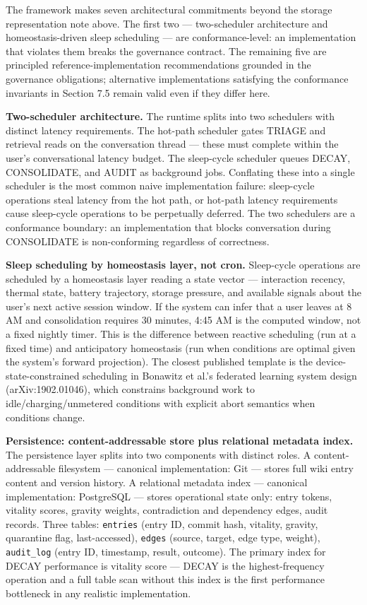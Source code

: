 \documentclass[
  11pt,
]{article}
\begin{document}
The framework makes seven architectural commitments beyond the storage
representation note above. The first two --- two-scheduler architecture
and homeostasis-driven sleep scheduling --- are conformance-level: an
implementation that violates them breaks the governance contract. The
remaining five are principled reference-implementation recommendations
grounded in the governance obligations; alternative implementations
satisfying the conformance invariants in Section 7.5 remain valid even
if they differ here.

\textbf{Two-scheduler architecture.} The runtime splits into two
schedulers with distinct latency requirements. The hot-path scheduler
gates TRIAGE and retrieval reads on the conversation thread --- these
must complete within the user's conversational latency budget. The
sleep-cycle scheduler queues DECAY, CONSOLIDATE, and AUDIT as background
jobs. Conflating these into a single scheduler is the most common naive
implementation failure: sleep-cycle operations steal latency from the
hot path, or hot-path latency requirements cause sleep-cycle operations
to be perpetually deferred. The two schedulers are a conformance
boundary: an implementation that blocks conversation during CONSOLIDATE
is non-conforming regardless of correctness.

\textbf{Sleep scheduling by homeostasis layer, not cron.} Sleep-cycle
operations are scheduled by a homeostasis layer reading a state vector
--- interaction recency, thermal state, battery trajectory, storage
pressure, and available signals about the user's next active session
window. If the system can infer that a user leaves at 8 AM and
consolidation requires 30 minutes, 4:45 AM is the computed window, not a
fixed nightly timer. This is the difference between reactive scheduling
(run at a fixed time) and anticipatory homeostasis (run when conditions
are optimal given the system's forward projection). The closest
published template is the device-state-constrained scheduling in
Bonawitz et al.'s federated learning system design (arXiv:1902.01046),
which constrains background work to idle/charging/unmetered conditions
with explicit abort semantics when conditions change.

\textbf{Persistence: content-addressable store plus relational metadata
index.} The persistence layer splits into two components with distinct
roles. A content-addressable filesystem --- canonical implementation:
Git --- stores full wiki entry content and version history. A relational
metadata index --- canonical implementation: PostgreSQL --- stores
operational state only: entry tokens, vitality scores, gravity weights,
contradiction and dependency edges, audit records. Three tables:
\texttt{entries} (entry ID, commit hash, vitality, gravity, quarantine
flag, last-accessed), \texttt{edges} (source, target, edge type,
weight), \texttt{audit\_log} (entry ID, timestamp, result, outcome). The
primary index for DECAY performance is vitality score --- DECAY is the
highest-frequency operation and a full table scan without this index is
the first performance bottleneck in any realistic implementation.
\end{document}
